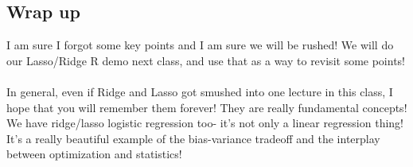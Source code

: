 \subsection{Wrap up}

I am sure I forgot some key points and I am sure we will be rushed! We will do our Lasso/Ridge R demo next class, and use that as a way to revisit some points! \\
\\
In general, even if Ridge and Lasso got smushed into one lecture in this class, I hope that you will remember them forever! They are really fundamental concepts! We have ridge/lasso logistic regression too- it's not only a linear regression thing! It's a really beautiful example of the bias-variance tradeoff and the interplay between optimization and statistics!
